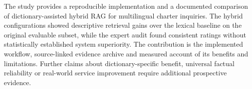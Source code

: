 The study provides a reproducible implementation and a documented comparison of dictionary-assisted hybrid RAG for multilingual charter inquiries. The hybrid configurations showed descriptive retrieval gains over the lexical baseline on the original evaluable subset, while the expert audit found consistent ratings without statistically established system superiority. The contribution is the implemented workflow, source-linked evidence archive and measured account of its benefits and limitations. Further claims about dictionary-specific benefit, universal factual reliability or real-world service improvement require additional prospective evidence.
